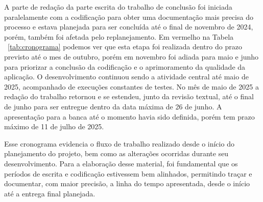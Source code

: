 A parte de redação da parte escrita do trabalho de conclusão foi iniciada paralelamente com a codificação para obter uma documentação mais precisa do processo e estava planejada para ser concluída até o final de novembro de 2024, porém, também foi afetada pelo replanejamento. Em vermelho na Tabela ~\ref{tab:cronograma} podemos ver que esta etapa foi realizada dentro do prazo previsto até o mes de outubro, porém em novembro foi adiada para maio e junho para priorizar a conclusão da codificação e o aprimoramento da qualidade da aplicação.
O desenvolvimento continuou sendo a atividade central até maio de 2025, acompanhado de execuções constantes de testes. No mês de maio de 2025 a redação do trabalho retornou e se estendeu, junto da revisão textual, até o final de junho para ser entregue dentro da data máxima de 26 de junho. A apresentação para a banca até o momento havia sido definida, porém tem prazo máximo de 11 de julho de 2025.

Esse cronograma evidencia o fluxo de trabalho realizado desde o início do planejamento do projeto, bem como as alterações ocorridas durante seu desenvolvimento. Para a elaboração desse material, foi fundamental que os períodos de escrita e codificação estivessem bem alinhados, permitindo traçar e documentar, com maior precisão, a linha do tempo apresentada, desde o início até a entrega final planejada.

